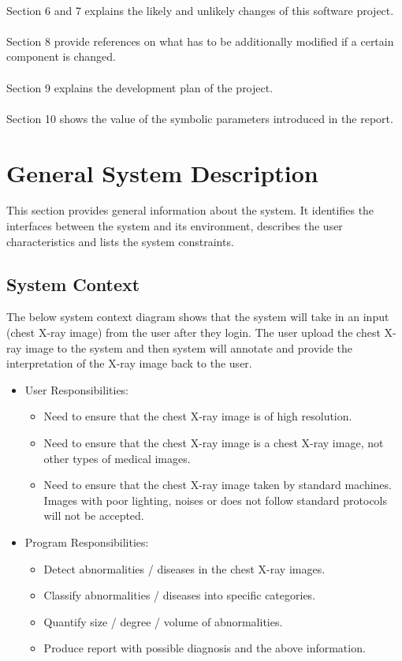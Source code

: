 \documentclass[12pt]{article}
\begin{document}
  \\
  Section 6 and 7 explains the likely and unlikely changes of this software project.\\
  \\
  Section 8 provide references on what has to be additionally modified if a certain component is changed.\\
  \\
  Section 9 explains the development plan of the project.\\
  \\
  Section 10 shows the value of the symbolic parameters introduced in the report.

\section{General System Description}

This section provides general information about the system.  It identifies the
interfaces between the system and its environment, describes the user
characteristics and lists the system constraints. \\

\subsection{System Context}

The below system context diagram shows that the system will take in an input (chest X-ray image) from the user after they login. The user upload the chest X-ray image to the system and then system will annotate and provide the interpretation of the X-ray image back to the user.



\begin{itemize}
\item User Responsibilities:
\begin{itemize}
\item {Need to ensure that the chest X-ray image is of high resolution. }
\item {Need to ensure that the chest X-ray image is a chest X-ray image, not other types of medical images.}
\item {Need to ensure that the chest X-ray image taken by standard machines. Images with poor lighting, noises or does not follow standard protocols will not be accepted. }
\end{itemize}
\item Program Responsibilities:
\begin{itemize}
\item {Detect abnormalities / diseases in the chest X-ray images.}
\item {Classify abnormalities / diseases into specific categories.}
\item {Quantify size / degree / volume of abnormalities.}
\item {Produce report with possible diagnosis and the above information.}
\end{itemize}
\end{itemize}
\end{document}
